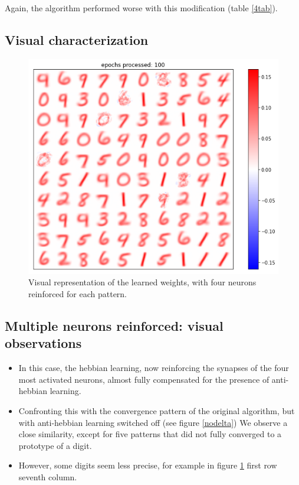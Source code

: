 \documentclass[a4paper]{report}
\begin{document}
Again, the algorithm performed worse with this modification (table \ref{4tab}).

\subsection{Visual characterization}

\begin{figure} [H]
\centering
\includegraphics [width=12cm ] {h/quattrocinque.png}
\caption{Visual representation of the learned weights, with four neurons reinforced for each pattern.}
\label{45}
\end{figure}

\subsection{Multiple neurons reinforced: visual observations}

\begin{itemize}
    \item In this case, the hebbian learning, now reinforcing the synapses of the four most activated neurons, almost fully compensated for the presence of anti-hebbian learning. 
    \item Confronting this with the convergence pattern of the original algorithm, but with anti-hebbian learning switched off  (see figure \ref{nodelta}) We observe a close similarity, except for five patterns that did not fully converged to a prototype of a digit.
    \item However, some digits seem less precise, for example in figure \ref{45} first row seventh column.
\end{itemize}
\end{document}

